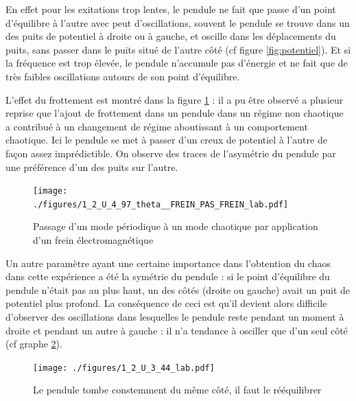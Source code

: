 \documentclass[a4paper,12pt,oneside]{article}
\begin{document}
En effet pour les exitations trop lentes, le pendule ne fait que passe d'un point d'équilibre à l'autre avec peut d'oscillations, souvent le pendule se trouve dans un des puits de potentiel à droite ou à gauche, et oscille dans les déplacements du puits, sans passer dans le puits situé de l'autre côté (cf figure \ref{fig:potentiel}). Et si la fréquence est trop élevée, le pendule n'accumule pas d'énergie et ne fait que de très faibles oscillations autours de son point d'équilibre.

L'effet du frottement est montré dans la figure \ref{fig:1_2_U_4_97_theta__FREIN_PAS_FREIN_lab} : il a pu être observé a plusieur reprise que l'ajout de frottement dans un pendule dans un régime non chaotique a contribué à un changement de régime aboutissant à un comportement chaotique. Ici le pendule se met à passer d'un creux de potentiel à l'autre de façon assez imprédictible. On observe des traces de l'asymétrie du pendule par une préférence d'un des puits sur l'autre.

\begin{figure}[h!]
  \begin{center}
  \texttt{[image: ./figures/1\_2\_U\_4\_97\_theta\_\_FREIN\_PAS\_FREIN\_lab.pdf]}
  \caption{Passage d'un mode périodique à un mode chaotique par application d'un frein électromagnétique} \label{fig:1_2_U_4_97_theta__FREIN_PAS_FREIN_lab}
  \end{center}
\end{figure}


Un autre paramètre ayant une certaine importance dans l'obtention du chaos dans cette expérience a été la symétrie du pendule : si le point d'équilibre du pendule n'était pas au plus haut, un des côtés (droite ou gauche) avait un puit de potentiel plus profond. La conséquence de ceci est qu'il devient alors difficile d'observer des oscillations dans lesquelles le pendule reste pendant un moment à droite et pendant un autre à gauche : il n'a tendance à osciller que d'un seul côté (cf graphe \ref{fig:1_2_U_3_44_lab}). 


\begin{figure}[h!]
  \begin{center}
  \texttt{[image: ./figures/1\_2\_U\_3\_44\_lab.pdf]}
  \caption{Le pendule tombe constemment du même côté, il faut le rééquilibrer} \label{fig:1_2_U_3_44_lab}
  \end{center}
\end{figure}
\end{document}
